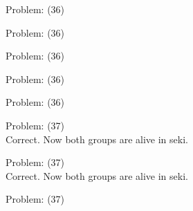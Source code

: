 \documentclass[11pt]{article}
\begin{document}
\begin{minipage}[t]{0.5\textwidth}
  {\centering
  
Problem: (36)\\
  }
\end{minipage}
\begin{minipage}[t]{0.5\textwidth}
  {\centering
  
Problem: (36)\\
  }
\end{minipage}
\begin{minipage}[t]{0.5\textwidth}
  {\centering
  
Problem: (36)\\
  }
\end{minipage}
\begin{minipage}[t]{0.5\textwidth}
  {\centering
  
Problem: (36)\\
  }
\end{minipage}
\begin{minipage}[t]{0.5\textwidth}
  {\centering
  
Problem: (36)\\
  }
\end{minipage}
\begin{minipage}[t]{0.5\textwidth}
  {\centering
  
Problem: (37)\\
Correct. Now both groups are alive in seki.\\
  }
\end{minipage}
\begin{minipage}[t]{0.5\textwidth}
  {\centering
  
Problem: (37)\\
Correct. Now both groups are alive in seki.\\
  }
\end{minipage}
\begin{minipage}[t]{0.5\textwidth}
  {\centering
  
Problem: (37)\\
  }
\end{minipage}
\end{document}
